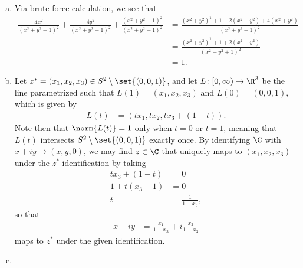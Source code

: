 \documentclass[10pt]{mypackage}
\begin{document}
\begin{solution}\hfill
  \begin{enumerate}[(a)]
    \item Via brute force calculation, we see that
      \begin{align*}
        \frac{4x^2}{\left( x^2 + y^2 + 1 \right)^2} + \frac{4y^2}{\left( x^2 + y^2 + 1 \right)^2} + \frac{\left( x^2 + y^2 - 1 \right)^2}{\left( x^2 + y^2 + 1 \right)^2} &= \frac{\left( x^2 + y^2 \right)^1 + 1 - 2\left( x^2 + y^2 \right) + 4\left( x^2 + y^2 \right)}{\left( x^2 + y^2 + 1 \right)^2}\\
                                                                                                                                                                                                  &= \frac{\left( x^2 + y^2 \right)^1 + 1 + 2\left( x^2 + y^2 \right)}{\left( x^2 + y^2 + 1 \right)^2}\\
                                                                                                                                                                                                                                                                                                                                                                                                                                                                                                                                                                                   &= 1.
      \end{align*}
    \item Let $z^{\ast} = \left( x_1,x_2,x_3 \right)\in S^{2}\setminus \set{(0,0,1)}$, and let $L\colon [0,\infty)\rightarrow \R^3$ be the line parametrized such that $L(1) = \left( x_1,x_2,x_3 \right)$ and $L(0) = \left( 0,0,1 \right)$, which is given by
      \begin{align*}
        L(t) &= \left( tx_1,tx_2, tx_3 + \left( 1-t \right) \right).
      \end{align*}
      Note then that $\norm{L(t)} = 1$ only when $t = 0$ or $t = 1$, meaning that $L(t)$ intersects $S^{2}\setminus \set{(0,0,1)}$ exactly once. By identifying $\C$ with $x + iy \mapsto \left( x,y,0 \right)$, we may find $z\in \C$ that uniquely maps to $\left( x_1,x_2,x_3 \right)$ under the $z^{\ast}$ identification by taking
      \begin{align*}
        tx_3 + \left( 1-t \right) &= 0\\
        1 + t\left( x_3 - 1 \right) &= 0\\
        t &= \frac{1}{1-x_3},
      \end{align*}
      so that
      \begin{align*}
        x+iy &= \frac{x_1}{1-x_3} + i\frac{x_2}{1-x_3}
      \end{align*}
      maps to $z^{\ast}$ under the given identification.
    \item 
  \end{enumerate}
\end{solution}
\end{document}
